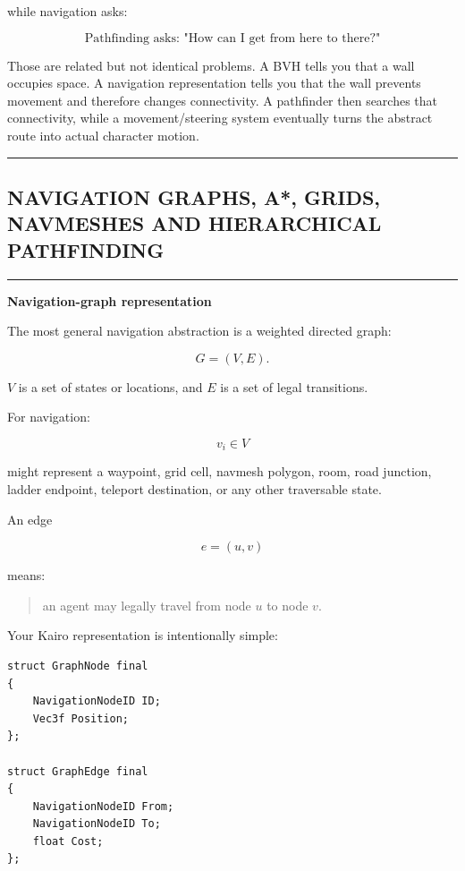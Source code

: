 while navigation asks:

\[
\text{Pathfinding asks: "How can I get from here to there?"}
\]

Those are related but not identical problems. A BVH tells you that a wall occupies space. A navigation representation tells you that the wall prevents movement and therefore changes connectivity. A pathfinder then searches that connectivity, while a movement/steering system eventually turns the abstract route into actual character motion.

\begin{center}\rule{0.5\linewidth}{0.5pt}\end{center}

\subsection{NAVIGATION GRAPHS, A*, GRIDS, NAVMESHES AND HIERARCHICAL PATHFINDING}\label{06-engine-ii-ch030-navigation-graphs-a-grids-navmeshes-and-hierarchical-pathfinding}

\hypertarget{06-engine-ii-ch030-navigation-graphs-a-grids-navmeshes-and-hierarchical-pathfinding}{}

\begin{center}\rule{0.5\linewidth}{0.5pt}\end{center}

\textbf{Navigation-graph representation}

The most general navigation abstraction is a weighted directed graph:

\[
G=(V,E).
\]

\(V\) is a set of states or locations, and \(E\) is a set of legal transitions.

For navigation:

\[
v_i\in V
\]

might represent a waypoint, grid cell, navmesh polygon, room, road junction, ladder endpoint, teleport destination, or any other traversable state.

An edge

\[
e=(u,v)
\]

means:

\begin{quote}
an agent may legally travel from node \(u\) to node \(v\).
\end{quote}

Your Kairo representation is intentionally simple:

\begin{verbatim}
struct GraphNode final
{
    NavigationNodeID ID;
    Vec3f Position;
};

struct GraphEdge final
{
    NavigationNodeID From;
    NavigationNodeID To;
    float Cost;
};
\end{verbatim}

